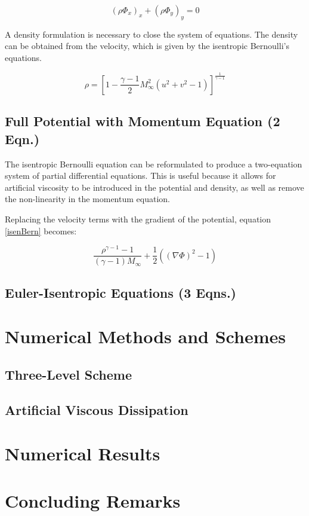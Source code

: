 \documentclass[hidelinks, 12pt]{article}
\begin{document}
\begin{equation}
\left(\rho \Phi_x\right)_x + \left(\rho \Phi_y\right)_y = 0
\end{equation}

A density formulation is necessary to close the system of equations. The density can be obtained from the velocity, which is given by the isentropic Bernoulli's equations. 

\begin{equation}
\rho = \left[1 - \dfrac{\gamma - 1}{2}M_{\infty}^2\left(u^2 + v^2 - 1\right)\right]^{\frac{1}{\gamma - 1}} \label{isenBern}
\end{equation}

\subsection{Full Potential with Momentum Equation (2 Eqn.)}
The isentropic Bernoulli equation can be reformulated to produce a two-equation system of partial differential equations. This is useful because it allows for  artificial viscosity to be introduced in the potential and density, as well as remove the non-linearity in the momentum equation.%

Replacing the velocity terms with the gradient of the potential, equation \ref{isenBern} becomes:

\begin{equation}
\dfrac{\rho^{\gamma -1} -1}{\left(\gamma - 1\right)M_{\infty}} + \dfrac{1}{2}\left(\left(\nabla\Phi\right)^2 - 1\right)
\end{equation}



\subsection{Euler-Isentropic Equations (3 Eqns.)}

\section{Numerical Methods and Schemes}\label{schemes}

\subsection{Three-Level Scheme}

\subsection{Artificial Viscous Dissipation}

\section{Numerical Results}


\section{Concluding Remarks}


	
\end{document}
